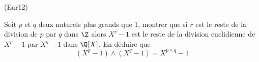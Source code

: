 \begin{tiny}(Ear12)\end{tiny} Soit $p$ et $q$ deux naturels plus grands que 1, montrer que si $r$ est le reste de la division de $p$ par $q$ dans $\Z$ alors $X^r-1$ est le reste de la division euclidienne de $X^p-1$ par $X^q-1$ dans $\Q[X]$. En déduire que 
\[(X^{p}-1)\wedge (X^{q}-1)=X^{p\wedge q}-1\]